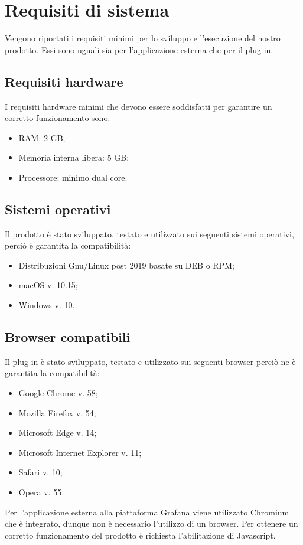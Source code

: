 \section{Requisiti di sistema}
Vengono riportati i requisiti minimi per lo sviluppo e l'esecuzione del nostro prodotto. Essi sono uguali sia per l'applicazione esterna che per il plug-in.

\subsection{Requisiti hardware}
I requisiti hardware minimi che devono essere soddisfatti per garantire un corretto funzionamento sono:
\begin{itemize}
	\item RAM: 2 GB;
	\item Memoria interna libera: 5 GB;
	\item Processore: minimo dual core.
\end{itemize}

\subsection{Sistemi operativi}
Il prodotto è stato sviluppato, testato e utilizzato sui seguenti sistemi operativi, perciò è garantita la compatibilità:
\begin{itemize}
	\item Distribuzioni Gnu/Linux post 2019 basate su DEB o RPM;
	\item macOS v. 10.15;
	\item Windows v. 10.
\end{itemize}

\subsection{Browser compatibili}
Il plug-in è stato sviluppato, testato e utilizzato sui seguenti browser perciò ne è garantita la compatibilità:
\begin{itemize}
	\item Google Chrome v. 58;
	\item Mozilla Firefox v. 54;
	\item Microsoft Edge v. 14;
	\item Microsoft Internet Explorer v. 11;
	\item Safari v. 10;
	\item Opera v. 55.
\end{itemize}
Per l'applicazione esterna alla piattaforma Grafana viene utilizzato Chromium che è integrato, dunque non è necessario l'utilizzo di un browser.
Per ottenere un corretto funzionamento del prodotto è richiesta l'abilitazione di Javascript.

